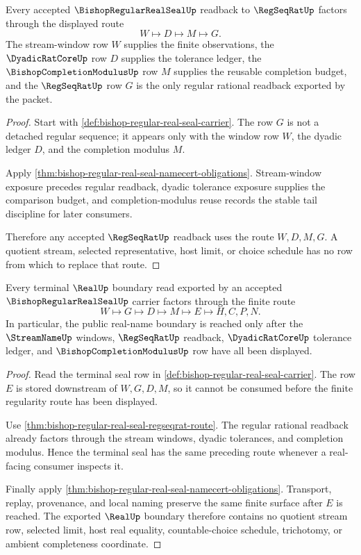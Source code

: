 \begin{theorem}
\label{thm:bishop-regular-real-seal-regseqrat-route}
Every accepted $\BishopRegularRealSealUp$ readback to $\RegSeqRatUp$ factors through the displayed route
$$
W \longmapsto D \longmapsto M \longmapsto G.
$$
The stream-window row $W$ supplies the finite observations, the $\DyadicRatCoreUp$ row $D$ supplies the tolerance ledger, the $\BishopCompletionModulusUp$ row $M$ supplies the reusable completion budget, and the $\RegSeqRatUp$ row $G$ is the only regular rational readback exported by the packet.
\end{theorem}
\begin{proof}
Start with \autoref{def:bishop-regular-real-seal-carrier}. The row $G$ is not a detached regular sequence; it appears only with the window row $W$, the dyadic ledger $D$, and the completion modulus $M$.

Apply \autoref{thm:bishop-regular-real-seal-namecert-obligations}. Stream-window exposure precedes regular readback, dyadic tolerance exposure supplies the comparison budget, and completion-modulus reuse records the stable tail discipline for later consumers.

Therefore any accepted $\RegSeqRatUp$ readback uses the route $W,D,M,G$. A quotient stream, selected representative, host limit, or choice schedule has no row from which to replace that route.
\end{proof}

\begin{theorem}
\label{thm:bishop-regular-real-seal-real-boundary}
Every terminal $\RealUp$ boundary read exported by an accepted $\BishopRegularRealSealUp$ carrier factors through the finite route
$$
W \longmapsto G \longmapsto D \longmapsto M \longmapsto E \longmapsto H,C,P,N.
$$
In particular, the public real-name boundary is reached only after the $\StreamNameUp$ windows, $\RegSeqRatUp$ readback, $\DyadicRatCoreUp$ tolerance ledger, and $\BishopCompletionModulusUp$ row have all been displayed.
\end{theorem}
\begin{proof}
Read the terminal seal row in \autoref{def:bishop-regular-real-seal-carrier}. The row $E$ is stored downstream of $W,G,D,M$, so it cannot be consumed before the finite regularity route has been displayed.

Use \autoref{thm:bishop-regular-real-seal-regseqrat-route}. The regular rational readback already factors through the stream windows, dyadic tolerances, and completion modulus. Hence the terminal seal has the same preceding route whenever a real-facing consumer inspects it.

Finally apply \autoref{thm:bishop-regular-real-seal-namecert-obligations}. Transport, replay, provenance, and local naming preserve the same finite surface after $E$ is reached. The exported $\RealUp$ boundary therefore contains no quotient stream row, selected limit, host real equality, countable-choice schedule, trichotomy, or ambient completeness coordinate.
\end{proof}

